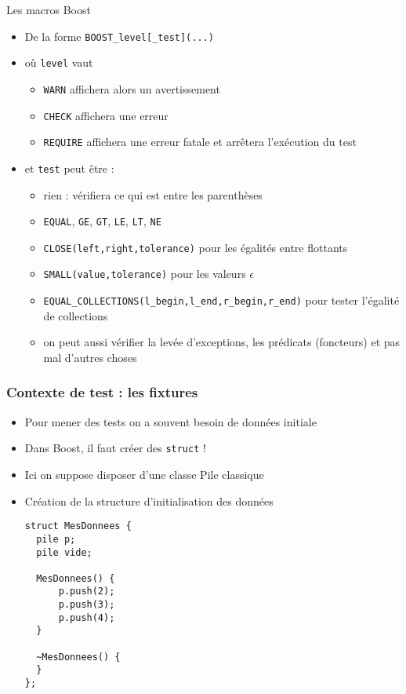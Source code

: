 \begin{frame}{Les macros Boost}
\begin{itemize}
\item De la forme \texttt{BOOST\_level[\_test](...)}
\item où \texttt{level} vaut
\begin{itemize}
\item \texttt{WARN} affichera alors un avertissement
\item \texttt{CHECK} affichera une erreur
\item \texttt{REQUIRE} affichera une erreur fatale et arrêtera l'exécution du test
\end{itemize}
\item et \texttt{test} peut être :
\begin{itemize}
\item rien : vérifiera ce qui est entre les parenthèses
\item \texttt{EQUAL}, \texttt{GE}, \texttt{GT}, \texttt{LE}, \texttt{LT}, \texttt{NE}
\item \texttt{CLOSE(left,right,tolerance)} pour les égalités entre flottants
\item \texttt{SMALL(value,tolerance)} pour les valeurs $\epsilon$
\item \texttt{EQUAL\_COLLECTIONS(l\_begin,l\_end,r\_begin,r\_end)} pour tester l'égalité de collections
\item on peut aussi vérifier la levée d'exceptions, les prédicats (foncteurs) et pas mal d'autres choses
\end{itemize}
\end{itemize}
\end{frame}

\begin{frame}[fragile]
\frametitle{Contexte de test : les fixtures}
\begin{itemize}
\item Pour mener des tests on a souvent besoin de données initiale
\item Dans Boost, il faut créer des \texttt{struct} !
\item Ici on suppose disposer d'une classe Pile classique
\item Création de la structure d'initialisation des données
\begin{lstlisting}
struct MesDonnees {
  pile p;
  pile vide;

  MesDonnees() {
      p.push(2);
      p.push(3);
      p.push(4);
  }

  ~MesDonnees() {
  }
};
\end{lstlisting}
\end{itemize}
\end{frame}


